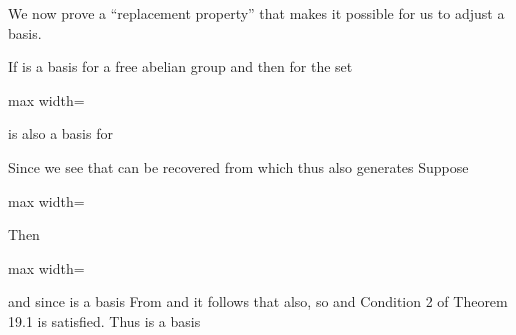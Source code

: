 \documentclass[11pt,oneside]{article}
\begin{document}
\begin{BookBody}

We now prove a “replacement property” that makes it possible for us to adjust a basis.

 If  is a basis for a free abelian group  and  then for  the set

\begin{center}\begin{adjustbox}{max width=\linewidth}\end{adjustbox}\end{center}

\noindent is also a basis for 

 Since  we see that  can be recovered from  which thus also generates  Suppose

\begin{center}\begin{adjustbox}{max width=\linewidth}\end{adjustbox}\end{center}

\noindent Then

\begin{center}\begin{adjustbox}{max width=\linewidth}\end{adjustbox}\end{center}

\noindent and since  is a basis From  and  it follows that  also, so  and Condition 2 of Theorem 19.1 is satisfied. Thus  is a basis\BookEnd{\blacklozenge}


\end{BookBody}
\end{document}

